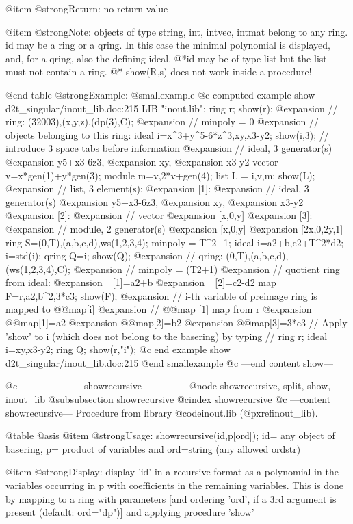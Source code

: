 @item @strong{Return:}
no return value

@item @strong{Note:}
objects of type string, int, intvec, intmat belong to any ring.
id may be a ring or a qring. In this case the minimal polynomial is
displayed, and, for a qring, also the defining ideal.
@*id may be of type list but the list must not contain a ring.
@* show(R,s) does not work inside a procedure!

@end table
@strong{Example:}
@smallexample
@c computed example show d2t_singular/inout_lib.doc:215 
LIB "inout.lib";
ring r;
show(r);
@expansion{} // ring: (32003),(x,y,z),(dp(3),C);
@expansion{} // minpoly = 0
@expansion{} // objects belonging to this ring:
ideal i=x^3+y^5-6*z^3,xy,x3-y2;
show(i,3);            // introduce 3 space tabs before information
@expansion{}    // ideal, 3 generator(s)
@expansion{} y5+x3-6z3,
@expansion{} xy,
@expansion{} x3-y2
vector v=x*gen(1)+y*gen(3);
module m=v,2*v+gen(4);
list L = i,v,m;
show(L);
@expansion{} // list, 3 element(s):
@expansion{} [1]:
@expansion{}    // ideal, 3 generator(s)
@expansion{} y5+x3-6z3,
@expansion{} xy,
@expansion{} x3-y2
@expansion{} [2]:
@expansion{}    // vector
@expansion{} [x,0,y]
@expansion{} [3]:
@expansion{}    // module, 2 generator(s)
@expansion{} [x,0,y]
@expansion{} [2x,0,2y,1]
ring S=(0,T),(a,b,c,d),ws(1,2,3,4);
minpoly = T^2+1;
ideal i=a2+b,c2+T^2*d2; i=std(i);
qring Q=i;
show(Q);
@expansion{} // qring: (0,T),(a,b,c,d),(ws(1,2,3,4),C);
@expansion{} // minpoly = (T2+1)
@expansion{} // quotient ring from ideal:
@expansion{} _[1]=a2+b
@expansion{} _[2]=c2-d2
map F=r,a2,b^2,3*c3;
show(F);
@expansion{} // i-th variable of preimage ring is mapped to @@map[i]
@expansion{} // @@map                 [1]  map from r
@expansion{} @@map[1]=a2
@expansion{} @@map[2]=b2
@expansion{} @@map[3]=3*c3
// Apply 'show' to i (which does not belong to the basering) by typing
// ring r; ideal i=xy,x3-y2; ring Q; show(r,"i");
@c end example show d2t_singular/inout_lib.doc:215
@end smallexample
@c ---end content show---

@c ------------------- showrecursive -------------
@node showrecursive, split, show, inout_lib
@subsubsection showrecursive
@cindex showrecursive
@c ---content showrecursive---
Procedure from library @code{inout.lib} (@pxref{inout_lib}).

@table @asis
@item @strong{Usage:}
showrecursive(id,p[ord]); id= any object of basering, p= product of
variables and ord=string (any allowed ordstr)

@item @strong{Display:}
display 'id' in a recursive format as a polynomial in the variables
occurring in p with coefficients in the remaining variables. This is
done by mapping to a ring with parameters [and ordering 'ord',
if a 3rd argument is present (default: ord="dp")] and applying
procedure 'show'

